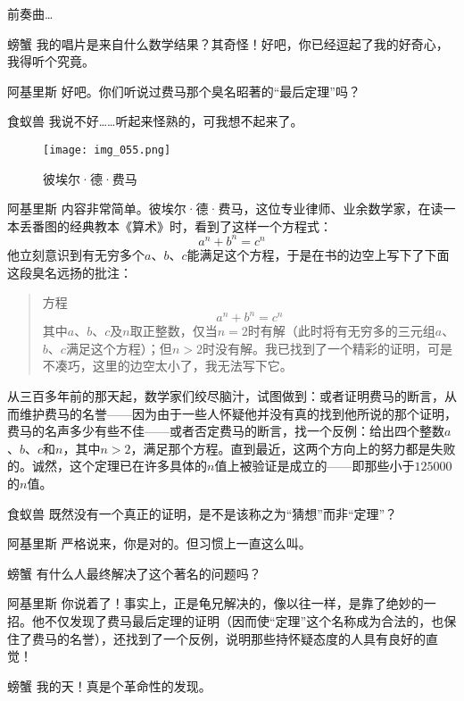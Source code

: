 \begin{dialog}{前奏曲…}
\begin{dialogue}
\item[螃蟹]我的唱片是来自什么数学结果？其奇怪！好吧，你已经逗起了我的好奇心，我得听个究竟。

\item[阿基里斯]好吧。你们听说过费马那个臭名昭著的“最后定理”吗？

\item[食蚁兽]我说不好……听起来怪熟的，可我想不起来了。

\begin{figure}
\texttt{[image: img\_055.png]}
\caption[彼埃尔·德·费马。]
  {彼埃尔·德·费马}
\end{figure}

\item[阿基里斯]内容非常简单。彼埃尔·德·费马，这位专业律师、业余数学家，在读一本丢番图的经典教本《算术》时，看到了这样一个方程式：
\[
  a^n+b^n=c^n
\]
他立刻意识到有无穷多个$a$、$b$、$c$能满足这个方程，于是在书的边空上写下了下面这段臭名远扬的批注：
\begin{quote}
方程
\[
  a^n+b^n=c^n
\]
其中$a$、$b$、$c$及$n$取正整数，仅当$n=2$时有解（此时将有无穷多的三元组$a$、$b$、$c$满足这个方程）；但$n>2$时没有解。我已找到了一个精彩的证明，可是不凑巧，这里的边空太小了，我无法写下它。
\end{quote}

从三百多年前的那天起，数学家们绞尽脑汁，试图做到：或者证明费马的断言，从而维护费马的名誉——因为由于一些人怀疑他并没有真的找到他所说的那个证明，费马的名声多少有些不佳——或者否定费马的断言，找一个反例：给出四个整数$a$、$b$、$c$和$n$，其中$n>2$，满足那个方程。直到最近，这两个方向上的努力都是失败的。诚然，这个定理已在许多具体的$n$值上被验证是成立的——即那些小于$125000$的$n$值。

\item[食蚁兽]既然没有一个真正的证明，是不是该称之为“猜想”而非“定理”？

\item[阿基里斯]严格说来，你是对的。但习惯上一直这么叫。

\item[螃蟹]有什么人最终解决了这个著名的问题吗？

\item[阿基里斯]你说着了！事实上，正是龟兄解决的，像以往一样，是靠了绝妙的一招。他不仅发现了费马最后定理的证明（因而使“定理”这个名称成为合法的，也保住了费马的名誉），还找到了一个反例，说明那些持怀疑态度的人具有良好的直觉！

\item[螃蟹]我的天！真是个革命性的发现。


\end{dialogue}
\end{dialog}
